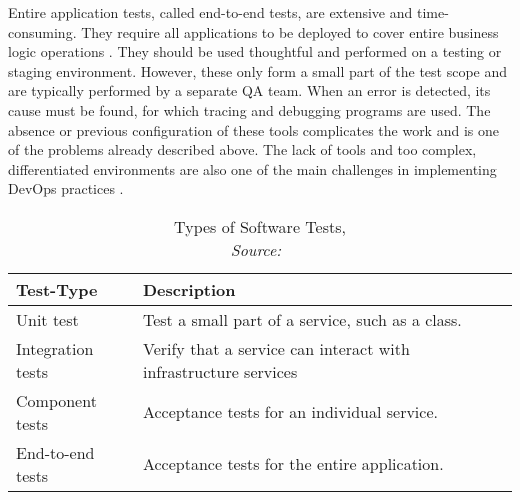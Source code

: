         Entire application tests, called end-to-end tests, are extensive and time-consuming. They require all applications to be deployed to cover entire business logic operations \cite{microtest}. They should be used thoughtful and performed on a testing or staging environment. However, these only form a small part of the test scope and are typically performed by a separate \ac{QA} team. When an error is detected, its cause must be found, for which tracing and debugging programs are used. The absence or previous configuration of these tools complicates the work and is one of the problems already described above. The lack of tools and too complex, differentiated environments are also one of the main challenges in implementing DevOps practices \cite{devops_challenge}.

        \begin{table}[]
            \centering
            \begin{tabularx}{0.9\textwidth}{lX}
                Test-Type & Description \\ \midrule\midrule
                Unit test& Test a small part of a service, such as a class.\\
                Integration tests & Verify that a service can interact with infrastructure services \\
                Component tests & Acceptance tests for an individual service. \\
                End-to-end tests & Acceptance tests for the entire application.
            \end{tabularx}
            \caption{Types of Software Tests, \\\textit{Source:~\cite{microtest}}}\label{tab::tests}
        \end{table}

